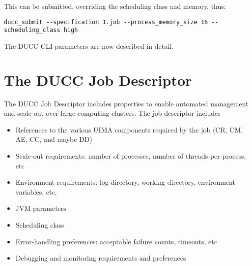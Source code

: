     This can be submitted, overriding the scheduling class and memory, thus:
\begin{verbatim}
ducc_submit --specification 1.job --process_memory_size 16 --scheduling_class high
\end{verbatim}    

    The DUCC CLI parameters are now described in detail.

    \section{The DUCC Job Descriptor}
    The DUCC Job Descriptor includes properties to enable automated management and scale-out 
    over large computing clusters.  The job descriptor includes
    \begin{itemize}
      \item References to the various UIMA components required by the job (CR, CM, AE, CC, and maybe DD)
      \item Scale-out requirements: number of processes, number of threads per process, etc
      \item Environment requirements: log directory, working directory, environment variables, etc,
      \item JVM parameters
      \item Scheduling class
      \item Error-handling preferences: acceptable failure counts, timeouts, etc
      \item Debugging and monitoring requirements and preferences
    \end{itemize}
  
